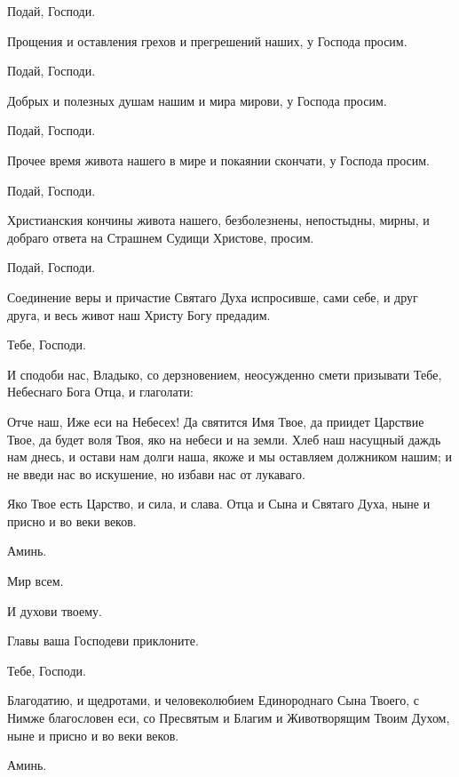 \begin{mymulticols}
 Подай, Господи.

 Прощения и оставления грехов и прегрешений наших, у Господа просим. 

 Подай, Господи.

 Добрых и полезных душам нашим и мира мирови, у Господа просим. 

 Подай, Господи.

 Прочее время живота нашего в мире и покаянии скончати, у Господа просим. 

 Подай, Господи.

 Христианския кончины живота нашего, безболезнены, непостыдны, мирны, и добраго ответа на Страшнем Судищи Христове, просим. 

 Подай, Господи.

 Соединение веры и причастие Святаго Духа испросивше, сами себе, и друг друга, и весь живот наш Христу Богу предадим. 

 Тебе, Господи. 

И сподоби нас, Владыко, со дерзновением, неосужденно смети призывати Тебе, Небеснаго Бога Отца, и глаголати: 


 Отче наш, Иже еси на Небесех! Да святится Имя Твое, да приидет Царствие Твое, да будет воля Твоя, яко на небеси и на земли. Хлеб наш насущный даждь нам днесь, и остави нам долги наша, якоже и мы оставляем должником нашим; и не введи нас во искушение, но избави нас от лукаваго. 

 Яко Твое есть Царство, и сила, и слава. Отца и Сына и Святаго Духа, ныне и присно и во веки веков. 

 Аминь. 

 Мир всем. 

 И духови твоему.

 Главы ваша Господеви приклоните.

 Тебе, Господи.

 Благодатию, и щедротами, и человеколюбием Единороднаго Сына Твоего, с Нимже благословен еси, со Пресвятым и Благим и Животворящим Твоим Духом, ныне и присно и во веки веков. 

 Аминь.



\end{mymulticols}
